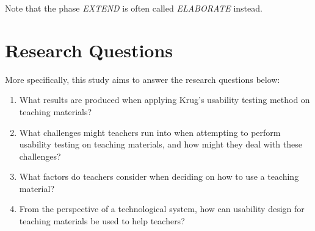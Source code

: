 Note that the phase \textit{EXTEND} is often called \textit{ELABORATE} instead.

\section{Research Questions}
More specifically, this study aims to answer the research questions below:

\begin{enumerate}
	\item What results are produced when applying Krug's usability testing method on teaching materials?
	\item What challenges might teachers run into when attempting to perform usability testing on teaching materials, and how might they deal with these challenges?
	\item What factors do teachers consider when deciding on how to use a teaching material?
	\item From the perspective of a technological system, how can usability design for teaching materials be used to help teachers?
\end{enumerate}

